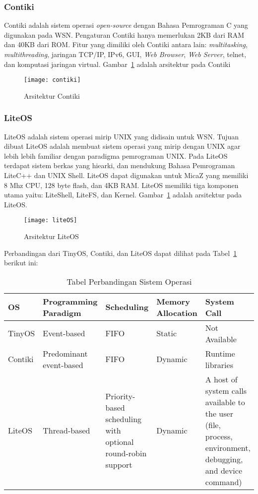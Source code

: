 \subsubsection{Contiki \cite{DBLP:journals/sensors/FarooqK11} }
Contiki adalah sistem operasi \textit{open-source} dengan Bahasa Pemrograman C yang digunakan pada WSN. Pengaturan Contiki hanya memerlukan 2KB dari RAM dan 40KB dari ROM. Fitur yang dimiliki oleh Contiki antara lain: \textit{multitasking}, \textit{multithreading}, jaringan TCP/IP, IPv6, GUI, \textit{Web Browser}, \textit{Web Server}, telnet, dan komputasi jaringan virtual. Gambar~\ref{fig:contiki} adalah arsitektur pada Contiki 
\begin{figure} [H]
	\centering  
	\texttt{[image: contiki]}  
	\caption[Arsitektur Contiki]{Arsitektur Contiki} 
	\label{fig:contiki} 
\end{figure}

\subsubsection{LiteOS \cite{DBLP:journals/sensors/FarooqK11} }
LiteOS adalah sistem operasi mirip UNIX yang didisain untuk WSN. Tujuan dibuat LiteOS adalah membuat sistem operasi yang mirip dengan UNIX agar lebih lebih familiar dengan paradigma pemrograman UNIX. Pada LiteOS terdapat sistem berkas yang hiearki, dan mendukung Bahasa Pemrograman LiteC++ dan UNIX Shell. LiteOS dapat digunakan untuk MicaZ yang memiliki 8 Mhz CPU, 128 byte flash, dan 4KB RAM. LiteOS memiliki tiga komponen utama yaitu: LiteShell, LiteFS, dan Kernel. Gambar~\ref{fig:contiki} adalah arsitektur pada LiteOS. 
\begin{figure} [H]
	\centering  
	\texttt{[image: liteOS]}  
	\caption[Arsitektur LiteOS]{Arsitektur LiteOS} 
	\label{fig:liteOS} 
\end{figure}

Perbandingan dari TinyOS, Contiki, dan LiteOS dapat dilihat pada Tabel~\ref{tab:perbandinganOS} berikut ini:
\begin{table}[H] %
	\centering 
	\caption{Tabel Perbandingan Sistem Operasi}
	\label{tab:perbandinganOS}
	\begin{tabular}{| p{1.6cm} | p{3.8cm} | p{2.5cm} | p{3cm} | p{4cm} |}
	    \hline
		OS & Programming Paradigm & Scheduling & Memory Allocation & System Call\\ 
		
		\hline
		TinyOS & Event-based & FIFO & Static & Not Available\\
		Contiki & Predominant event-based & FIFO & Dynamic & Runtime libraries\\ 
		LiteOS & Thread-based & Priority-based scheduling with optional round-robin support & Dynamic & A host of system calls available to the user (file, process, environment, debugging, and device command) 	\\ 

		\hline
		
	\end{tabular} 
\end{table}

